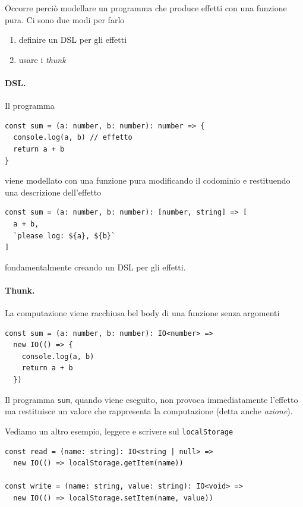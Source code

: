 \documentclass[12pt]{article}
\begin{document}
Occorre perciò modellare un programma che produce effetti con una funzione pura. Ci sono due modi per farlo

\begin{enumerate}
  \item definire un DSL per gli effetti
  \item usare i \emph{thunk}
\end{enumerate}

\paragraph{DSL.} Il programma

\begin{verbatim}
const sum = (a: number, b: number): number => {
  console.log(a, b) // effetto
  return a + b
}
\end{verbatim}

viene modellato con una funzione pura modificando il codominio e restituendo una descrizione dell'effetto

\begin{verbatim}
const sum = (a: number, b: number): [number, string] => [
  a + b,
  `please log: ${a}, ${b}`
]
\end{verbatim}

fondamentalmente creando un DSL per gli effetti.

\paragraph{Thunk.} La computazione viene racchiusa bel body di una funzione senza argomenti

\begin{verbatim}
const sum = (a: number, b: number): IO<number> =>
  new IO(() => {
    console.log(a, b)
    return a + b
  })
\end{verbatim}

Il programma \texttt{sum}, quando viene eseguito, non provoca immediatamente l'effetto ma restituisce un valore che rappresenta
la computazione (detta anche \emph{azione}).

Vediamo un altro esempio, leggere e scrivere sul \texttt{localStorage}

\begin{verbatim}
const read = (name: string): IO<string | null> =>
  new IO(() => localStorage.getItem(name))

const write = (name: string, value: string): IO<void> =>
  new IO(() => localStorage.setItem(name, value))
\end{verbatim}
\end{document}
